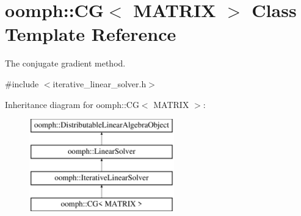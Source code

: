 \hypertarget{classoomph_1_1CG}{}\section{oomph\+:\+:CG$<$ M\+A\+T\+R\+IX $>$ Class Template Reference}
\label{classoomph_1_1CG}


The conjugate gradient method.  




{\ttfamily \#include $<$iterative\+\_\+linear\+\_\+solver.\+h$>$}

Inheritance diagram for oomph\+:\+:CG$<$ M\+A\+T\+R\+IX $>$\+:\begin{figure}[H]
\begin{center}
\leavevmode
\includegraphics[height=4.000000cm]{classoomph_1_1CG}
\end{center}
\end{figure}
